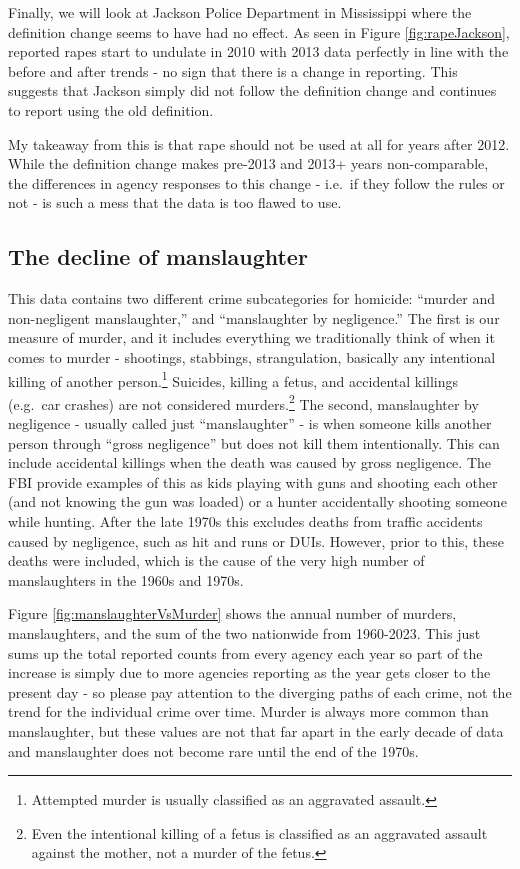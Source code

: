 \documentclass[
]{krantz}
\begin{document}
Finally, we will look at Jackson Police Department in
Mississippi where the definition change seems to have had no
effect. As seen in Figure \ref{fig:rapeJackson}, reported
rapes start to undulate in 2010 with 2013 data perfectly in
line with the before and after trends - no sign that there
is a change in reporting. This suggests that Jackson simply
did not follow the definition change and continues to report
using the old definition.

My takeaway from this is that rape should not be used at all
for years after 2012. While the definition change makes
pre-2013 and 2013+ years non-comparable, the differences in
agency responses to this change - i.e.~if they follow the
rules or not - is such a mess that the data is too flawed to
use.

\subsection{The decline of
manslaughter}\label{the-decline-of-manslaughter}

This data contains two different crime subcategories for
homicide: ``murder and non-negligent manslaughter,'' and
``manslaughter by negligence.'' The first is our measure of
murder, and it includes everything we traditionally think of
when it comes to murder - shootings, stabbings,
strangulation, basically any intentional killing of another
person.\footnote{Attempted murder is usually classified as
  an aggravated assault.} Suicides, killing a fetus, and
accidental killings (e.g.~car crashes) are not considered
murders.\footnote{Even the intentional killing of a fetus is
  classified as an aggravated assault against the mother,
  not a murder of the fetus.} The second, manslaughter by
negligence - usually called just ``manslaughter'' - is when
someone kills another person through ``gross negligence''
but does not kill them intentionally. This can include
accidental killings when the death was caused by gross
negligence. The FBI provide examples of this as kids playing
with guns and shooting each other (and not knowing the gun
was loaded) or a hunter accidentally shooting someone while
hunting. After the late 1970s this excludes deaths from
traffic accidents caused by negligence, such as hit and runs
or DUIs. However, prior to this, these deaths were included,
which is the cause of the very high number of manslaughters
in the 1960s and 1970s.

Figure \ref{fig:manslaughterVsMurder} shows the annual
number of murders, manslaughters, and the sum of the two
nationwide from 1960-2023. This just sums up the total
reported counts from every agency each year so part of the
increase is simply due to more agencies reporting as the
year gets closer to the present day - so please pay
attention to the diverging paths of each crime, not the
trend for the individual crime over time. Murder is always
more common than manslaughter, but these values are not that
far apart in the early decade of data and manslaughter does
not become rare until the end of the 1970s.
\end{document}
